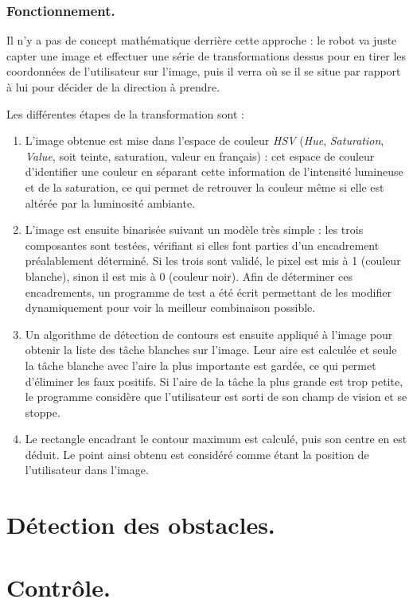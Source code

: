 \subsection{Fonctionnement.}
Il n'y a pas de concept mathématique derrière cette approche : le robot va juste capter une image et effectuer une série de transformations dessus pour en tirer les coordonnées de l'utilisateur sur l'image, puis il verra où se il se situe par rapport à lui pour décider de la direction à prendre.

Les différentes étapes de la transformation sont : \begin{enumerate}
    \item L'image obtenue est mise dans l'espace de couleur \emph{HSV} (\emph{Hue}, \emph{Saturation}, \emph{Value}, soit teinte, saturation, valeur en français) : cet espace de couleur d'identifier une couleur en séparant cette information de l'intensité lumineuse et de la saturation, ce qui permet de retrouver la couleur même si elle est altérée par la luminosité ambiante. %
    \item L'image est ensuite binarisée suivant un modèle très simple : les trois composantes sont testées, vérifiant si elles font parties d'un encadrement préalablement déterminé. Si les trois sont validé, le pixel est mis à 1 (couleur blanche), sinon il est mis à 0 (couleur noir). Afin de déterminer ces encadrements, un programme de test a été écrit permettant de les modifier dynamiquement pour voir la meilleur combinaison possible. %
    \item Un algorithme de détection de contours est ensuite appliqué à l'image pour obtenir la liste des tâche blanches sur l'image. Leur aire est calculée et seule la tâche blanche avec l'aire la plus importante est gardée, ce qui permet d'éliminer les faux positifs. Si l'aire de la tâche la plus grande est trop petite, le programme considère que l'utilisateur est sorti de son champ de vision et se stoppe.
    \item Le rectangle encadrant le contour maximum est calculé, puis son centre en est déduit. Le point ainsi obtenu est considéré comme étant la position de l'utilisateur dans l'image.
\end{enumerate}

\chapter{Détection des obstacles.}

\chapter{Contrôle.}

